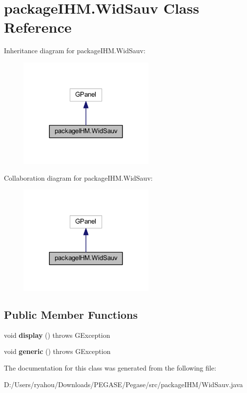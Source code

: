 \hypertarget{classpackage_i_h_m_1_1_wid_sauv}{}\section{package\+I\+H\+M.\+Wid\+Sauv Class Reference}
\label{classpackage_i_h_m_1_1_wid_sauv}


Inheritance diagram for package\+I\+H\+M.\+Wid\+Sauv\+:
\nopagebreak
\begin{figure}[H]
\begin{center}
\leavevmode
\includegraphics[width=192pt]{classpackage_i_h_m_1_1_wid_sauv__inherit__graph}
\end{center}
\end{figure}


Collaboration diagram for package\+I\+H\+M.\+Wid\+Sauv\+:
\nopagebreak
\begin{figure}[H]
\begin{center}
\leavevmode
\includegraphics[width=192pt]{classpackage_i_h_m_1_1_wid_sauv__coll__graph}
\end{center}
\end{figure}
\subsection*{Public Member Functions}
\begin{DoxyCompactItemize}
\item 
\mbox{\label{classpackage_i_h_m_1_1_wid_sauv_ac2e48994a8688a477fc0d658d44699d0}} 
void {\bfseries display} ()  throws G\+Exception 
\item 
\mbox{\label{classpackage_i_h_m_1_1_wid_sauv_ad45f3c0970c7b63b8126260e5f86aa7f}} 
void {\bfseries generic} ()  throws G\+Exception 
\end{DoxyCompactItemize}


The documentation for this class was generated from the following file\+:\begin{DoxyCompactItemize}
\item 
D\+:/\+Users/ryahou/\+Downloads/\+P\+E\+G\+A\+S\+E/\+Pegase/src/package\+I\+H\+M/Wid\+Sauv.\+java\end{DoxyCompactItemize}
